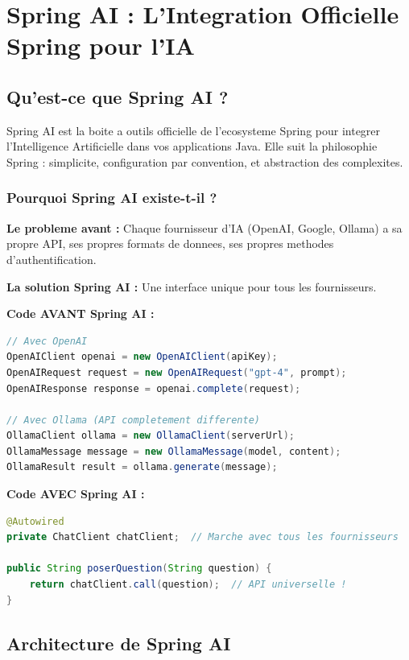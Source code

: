 \documentclass[a4paper,12pt]{article}
\begin{document}
\section{Spring AI : L'Integration Officielle Spring pour l'IA}

\subsection{Qu'est-ce que Spring AI ?}
Spring AI est la boite a outils officielle de l'ecosysteme Spring pour integrer l'Intelligence Artificielle dans vos applications Java. Elle suit la philosophie Spring : simplicite, configuration par convention, et abstraction des complexites.

\subsubsection{Pourquoi Spring AI existe-t-il ?}
\textbf{Le probleme avant :} Chaque fournisseur d'IA (OpenAI, Google, Ollama) a sa propre API, ses propres formats de donnees, ses propres methodes d'authentification.

\textbf{La solution Spring AI :} Une interface unique pour tous les fournisseurs.

\textbf{Code AVANT Spring AI :}
\begin{lstlisting}[language=Java]
// Avec OpenAI
OpenAIClient openai = new OpenAIClient(apiKey);
OpenAIRequest request = new OpenAIRequest("gpt-4", prompt);
OpenAIResponse response = openai.complete(request);

// Avec Ollama (API completement differente)
OllamaClient ollama = new OllamaClient(serverUrl);
OllamaMessage message = new OllamaMessage(model, content);
OllamaResult result = ollama.generate(message);
\end{lstlisting}

\textbf{Code AVEC Spring AI :}
\begin{lstlisting}[language=Java]
@Autowired
private ChatClient chatClient;  // Marche avec tous les fournisseurs

public String poserQuestion(String question) {
    return chatClient.call(question);  // API universelle !
}
\end{lstlisting}

\subsection{Architecture de Spring AI}
\end{document}
